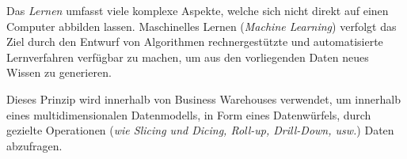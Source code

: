 






















%
{}%
{Das \textit{Lernen} umfasst viele komplexe Aspekte, welche sich nicht direkt auf einen Computer abbilden lassen. Maschinelles Lernen (\textit{Machine Learning}) verfolgt das Ziel durch den Entwurf von Algorithmen rechnergestützte und automatisierte Lernverfahren verfügbar zu machen, um aus den vorliegenden Daten neues Wissen zu generieren.}

%
{}%
{Dieses Prinzip wird innerhalb von Business Warehouses verwendet, um innerhalb eines multidimensionalen Datenmodells, in Form eines Datenwürfels, durch gezielte Operationen (\textit{wie Slicing und Dicing, Roll-up, Drill-Down, usw.}) Daten abzufragen.}

